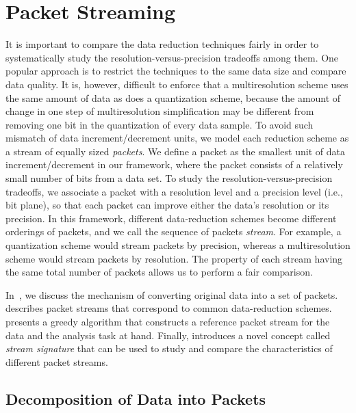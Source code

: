 \section{Packet Streaming} \label{sec:terminologies}

It is important to compare the data reduction techniques fairly in order to systematically study the
resolution-versus-precision tradeoffs among them. One popular approach is to restrict the techniques
to the same data size and compare data quality. It is, however, difficult to enforce that a
multiresolution scheme uses the same amount of data as does a quantization scheme, because the amount
of change in one step of multiresolution simplification may be different from removing one bit in
the quantization of every data sample. To avoid such mismatch of data increment/decrement units, we
model each reduction scheme as a stream of equally sized \emph{packets}. We define a packet as the
smallest unit of data increment/decrement in our framework, where the packet consists of a relatively
small number of bits from a data set. To study the resolution-versus-precision tradeoffs, we
associate a packet with a resolution level and a precision level (i.e., bit plane), so that each
packet can improve either the data's resolution or its precision. In this framework, different
data-reduction schemes become different orderings of packets, and we call the sequence of packets
\emph{stream}. For example, a quantization scheme would stream packets by precision, whereas a
multiresolution scheme would stream packets by resolution. The property of each stream having the
same total number of packets allows us to perform a fair comparison.

In~, we discuss the mechanism of converting original data into a
set of packets.  describes packet streams that correspond to common
data-reduction schemes.  presents a greedy algorithm that constructs a
reference packet stream for the data and the analysis task at hand. Finally,
 introduces a novel concept called \emph{stream signature} that can be
used to study and compare the characteristics of different packet streams.

\subsection{Decomposition of Data into Packets} \label{sec:data-streaming-framework}

